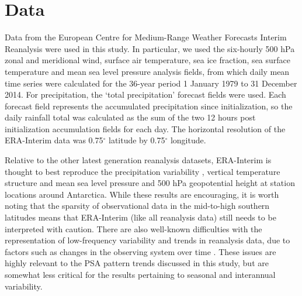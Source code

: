 \section{Data}

Data from the European Centre for Medium-Range Weather Forecasts Interim Reanalysis \citep[ERA-Interim;][]{Dee2011} were used in this study. In particular, we used the six-hourly 500 hPa zonal and meridional wind, surface air temperature, sea ice fraction, sea surface temperature and mean sea level pressure analysis fields, from which daily mean time series were calculated for the 36-year period 1 January 1979 to 31 December 2014. For precipitation, the `total precipitation' forecast fields were used. Each forecast field represents the accumulated precipitation since initialization, so the daily rainfall total was calculated as the sum of the two 12 hours post initialization accumulation fields for each day. The horizontal resolution of the ERA-Interim data was 0.75$^{\circ}$ latitude by 0.75$^{\circ}$ longitude.  

Relative to the other latest generation reanalysis datasets, ERA-Interim is thought to best reproduce the precipitation variability \citep{Bromwich2011,Nicolas2011}, vertical temperature structure \citep{Screen2012} and mean sea level pressure and 500 hPa geopotential height at station locations \citep{Bracegirdle2012} around Antarctica. While these results are encouraging, it is worth noting that the sparsity of observational data in the mid-to-high southern latitudes means that ERA-Interim (like all reanalysis data) still needs to be interpreted with caution. There are also well-known difficulties with the representation of low-frequency variability and trends in reanalysis data, due to factors such as changes in the observing system over time \citep{Dee2014}. These issues are highly relevant to the PSA pattern trends discussed in this study, but are somewhat less critical for the results pertaining to seasonal and interannual variability.
